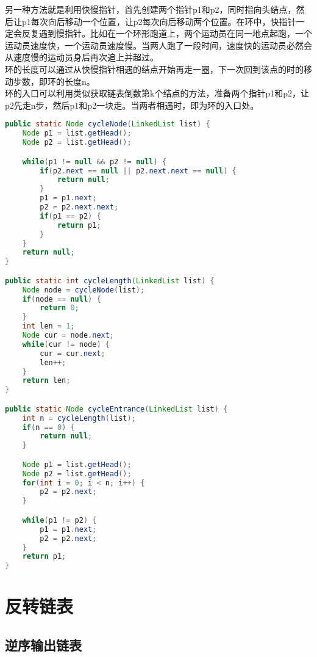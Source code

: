 另一种方法就是利用快慢指针，首先创建两个指针p1和p2，同时指向头结点，然后让p1每次向后移动一个位置，让p2每次向后移动两个位置。在环中，快指针一定会反复遇到慢指针。比如在一个环形跑道上，两个运动员在同一地点起跑，一个运动员速度快，一个运动员速度慢。当两人跑了一段时间，速度快的运动员必然会从速度慢的运动员身后再次追上并超过。\\

环的长度可以通过从快慢指针相遇的结点开始再走一圈，下一次回到该点的时的移动步数，即环的长度n。\\

环的入口可以利用类似获取链表倒数第k个结点的方法，准备两个指针p1和p2，让p2先走n步，然后p1和p2一块走。当两者相遇时，即为环的入口处。\\


\begin{lstlisting}[language=Java]
public static Node cycleNode(LinkedList list) {
    Node p1 = list.getHead();
    Node p2 = list.getHead();

    while(p1 != null && p2 != null) {
        if(p2.next == null || p2.next.next == null) {
            return null;
        }
        p1 = p1.next;
        p2 = p2.next.next;
        if(p1 == p2) {
            return p1;
        }
    }
    return null;
}

public static int cycleLength(LinkedList list) {
    Node node = cycleNode(list);
    if(node == null) {
        return 0;
    }
    int len = 1;
    Node cur = node.next;
    while(cur != node) {
        cur = cur.next;
        len++;
    }
    return len;
}

public static Node cycleEntrance(LinkedList list) {
    int n = cycleLength(list);
    if(n == 0) {
        return null;
    }

    Node p1 = list.getHead();
    Node p2 = list.getHead();
    for(int i = 0; i < n; i++) {
        p2 = p2.next;
    }

    while(p1 != p2) {
        p1 = p1.next;
        p2 = p2.next;
    }
    return p1;
}
\end{lstlisting}

\newpage

\section{反转链表}

\subsection{逆序输出链表}

